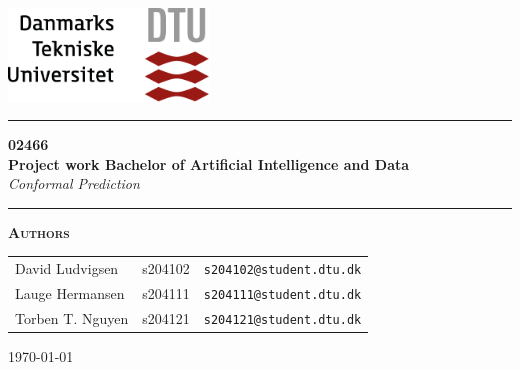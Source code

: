 
\begin{titlepage}
\begin{center}
\vspace{2cm}
\includegraphics[width=0.4\textwidth]{root/dtu.png}~\\[1cm]
\vspace{3cm}

\hrule
\vspace{.5cm}
{ \LARGE \textbf{02466 \\ Project work Bachelor of Artificial Intelligence and Data} \vspace{0.3cm} \\ \LARGE \textit{Conformal Prediction}} %
\vspace{.5cm}

\hrule
\vspace{1.5cm}

\textsc{\textbf{Authors}}\\
\vspace{.25cm}
\centering

\begin{table}[h]
    \centering
    \begin{tabular}{l c c}
        David Ludvigsen      & s204102 & \texttt{s204102@student.dtu.dk} \\
        Lauge Hermansen      & s204111 & \texttt{s204111@student.dtu.dk} \\
        Torben T. Nguyen & s204121 & \texttt{s204121@student.dtu.dk} \\
    \end{tabular}
\end{table}

\vspace{1.5cm}



\end{center}

\begin{center}
    \today %
\end{center}
\end{titlepage}
